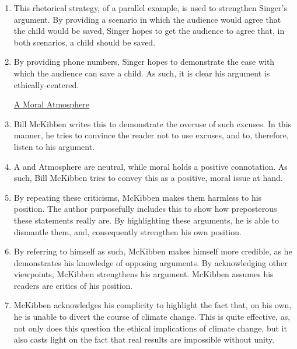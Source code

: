 \documentclass[12pt]{article}
\begin{document}
\begin{enumerate}
  \item This rhetorical strategy, of a parallel example, is used to strengthen Singer's argument. By providing a scenario in which the audience would agree that the child would be saved, Singer hopes to get the audience to agree that, in both scenarios, a child should be saved.

  \item By providing phone numbers, Singer hopes to demonstrate the ease with which the audience can save a child. As such, it is clear his argument is ethically-centered.

    \begin{center}
  \underline{A Moral Atmosphere}
    \end{center}

  \setcounter{enumi}{0}

  \item Bill McKibben writes this to demonstrate the overuse of such excuses. In this manner, he tries to convince the reader not to use excuses, and to, therefore, listen to his argument.

  \item A and Atmosphere are neutral, while moral holds a positive connotation. As such, Bill McKibben tries to convey this as a positive, moral issue at hand. 

  \item By repeating these criticisms, McKibben makes them harmless to his position. The author purposefully includes this to show how preposterous these statements really are. By highlighting these arguments, he is able to dismantle them, and, consequently strengthen his own position.

  \item By referring to himself as such, McKibben makes himself more credible, as he demonstrates his knowledge of opposing arguments. By acknowledging other viewpoints, McKibben strengthens his argument. McKibben assumes his readers are critics of his position.

  \item McKibben acknowledges his complicity to highlight the fact that, on his own, he is unable to divert the course of climate change. This is quite effective, as, not only does this question the ethical implications of climate change, but it also casts light on the fact that real results are impossible without unity.

\end{enumerate}
\end{document}
